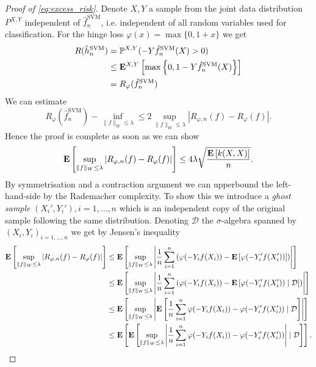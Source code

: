 \begin{proof}[Proof of \autoref{eq:excess_risk}]
Denote $X, Y$ a sample from the joint data distribution $P^{X, Y}$ independent of $\hat{f}_n^\mathrm{SVM}$, i.e. independent of all random variables used for classification. For the hinge loss $\varphi(x) = \max\{0, 1 + x\}$ we get
\begin{align*}
	R(\hat{h}_n^\mathrm{SVM}) &= \mathbb{P}^{X, Y}(-Y\hat{f}_n^\mathrm{SVM}(X) > 0) \\ 
	&\leq \mathbf{E}^{X, Y}\left[\max\left\{0, 1- Y\hat{f}_n^\mathrm{SVM}(X) \right\} \right] \\
	& = R_\varphi(\hat{f}_n^\mathrm{SVM})
\end{align*}
We can estimate
\begin{equation*}
	R_\varphi(\hat{f}_n^\mathrm{SVM}) - \inf_{\|f\|_W \leq \lambda} \leq 2 \sup_{\|f\|_W\leq \lambda} \left|R_{\varphi,n}(f) - R_\varphi(f)\right|.
\end{equation*}
Hence the proof is complete as soon as we can show
\begin{equation*}
	\mathbf{E}\left[\sup_{\|f\|_W\leq \lambda} \left|R_{\varphi,n}(f) - R_\varphi(f)\right|\right] \leq 4\lambda \sqrt{\frac{\mathbf{E}\left[k(X, X)\right]}{n}}.
\end{equation*}
By symmetrisation and a contraction argument we can upperbound the left-hand-side by the Rademacher complexity. To show this we introduce a \emph{ghost sample} $(X_i', Y_i'), i=1, \ldots,n$ which is an independent copy of the original sample following the same distribution. Denoting $\mathcal{D}$ the $\sigma$-algebra spanned by $(X_i, Y_i)_{i=1, \ldots, n}$ we get by Jensen's inequality
\begin{align*}
	\E\left[\sup_{\|f\|_W\leq \lambda} \left|R_{\varphi,n}(f) - R_\varphi(f)\right|\right] &\leq \E\left[\sup_{\|f\|_W\leq \lambda} \left|\frac{1}{n}\sum_{i=1}^n\left(\varphi(-Y_if(X_i)) - \E\left[\varphi(-Y_i'f(X_i'))\right]\right)\right|\right] \\
	& \leq \E\left[\sup_{\|f\|_W\leq \lambda} \left|\frac{1}{n}\sum_{i=1}^n\left(\varphi(-Y_if(X_i)) - \E\left[\varphi(-Y_i'f(X_i'))\mid \mathcal{D}\right]\right)\right|\right] \\
	& \leq \E\left[\sup_{\|f\|_W\leq \lambda} \left|\E\left[\frac{1}{n}\sum_{i=1}^n\varphi(-Y_if(X_i)) - \varphi(-Y_i'f(X_i'))\mid \mathcal{D}\right]\right|\right] \\
	& \leq \E\left[\E\left[\sup_{\|f\|_W\leq \lambda} \left|\frac{1}{n}\sum_{i=1}^n\varphi(-Y_if(X_i)) - \varphi(-Y_i'f(X_i'))\right|\mid \mathcal{D}\right]\right].

\end{align*}
\end{proof}
